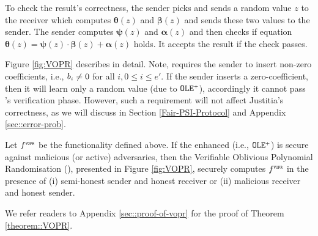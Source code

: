 To check the result's correctness, the sender picks and sends a random value $z$ to the receiver which computes  $\bm\theta(z)$ and $\bm\beta(z)$ and sends these two values  to the sender. The sender computes  $\bm\psi(z)$ and $\bm\alpha(z)$ and then checks if equation  $\bm\theta({ z})=\bm\psi({ z})\cdot \bm\beta({ z})+\bm\alpha({ z})$ holds. It accepts the result if the check passes.   

Figure \ref{fig:VOPR} describes \vopr in detail. Note, \vopr requires the sender to insert non-zero coefficients, i.e., $b_{\scriptscriptstyle i}\neq 0$ for all $i,0 \leq i \leq e'$. If the   sender inserts a zero-coefficient, then it will learn only a random value (due to  $\mathtt{OLE}^{\scriptscriptstyle +}$), accordingly it cannot pass \vopr's verification phase. However, such a requirement will not affect Justitia's correctness, as we will discuss in Section \ref{Fair-PSI-Protocol} and Appendix \ref{sec::error-prob}.  

\vspace{-3mm}



\begin{theorem}\label{theorem::VOPR}
%
Let $f^{\scriptscriptstyle \mathtt{VOPR}}$ be the functionality defined above. If the enhanced \ole (i.e., $\mathtt{OLE}^{\scriptscriptstyle +}$) is secure against malicious (or active) adversaries, then the  Verifiable Oblivious Polynomial Randomisation (\vopr), presented in Figure \ref{fig:VOPR}, securely computes $f^{\scriptscriptstyle \mathtt{VOPR}}$ in the presence of (i) semi-honest sender and honest receiver or (ii) malicious receiver and honest sender. 
%
\end{theorem}

\vspace{-1mm}
We refer readers to Appendix \ref{sec::proof-of-vopr} for the proof of Theorem \ref{theorem::VOPR}. 




%

